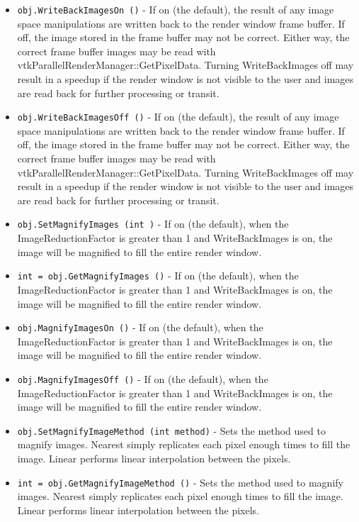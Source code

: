 \begin{itemize}
\item  \verb|obj.WriteBackImagesOn ()| -  If on (the default), the result of any image space manipulations are
 written back to the render window frame buffer.  If off, the image
 stored in the frame buffer may not be correct.  Either way, the
 correct frame buffer images may be read with
 vtkParallelRenderManager::GetPixelData.  Turning WriteBackImages off
 may result in a speedup if the render window is not visible to the user
 and images are read back for further processing or transit.

\item  \verb|obj.WriteBackImagesOff ()| -  If on (the default), the result of any image space manipulations are
 written back to the render window frame buffer.  If off, the image
 stored in the frame buffer may not be correct.  Either way, the
 correct frame buffer images may be read with
 vtkParallelRenderManager::GetPixelData.  Turning WriteBackImages off
 may result in a speedup if the render window is not visible to the user
 and images are read back for further processing or transit.

\item  \verb|obj.SetMagnifyImages (int )| -  If on (the default), when the ImageReductionFactor is greater than 1
 and WriteBackImages is on, the image will be magnified to fill the
 entire render window.

\item  \verb|int = obj.GetMagnifyImages ()| -  If on (the default), when the ImageReductionFactor is greater than 1
 and WriteBackImages is on, the image will be magnified to fill the
 entire render window.

\item  \verb|obj.MagnifyImagesOn ()| -  If on (the default), when the ImageReductionFactor is greater than 1
 and WriteBackImages is on, the image will be magnified to fill the
 entire render window.

\item  \verb|obj.MagnifyImagesOff ()| -  If on (the default), when the ImageReductionFactor is greater than 1
 and WriteBackImages is on, the image will be magnified to fill the
 entire render window.

\item  \verb|obj.SetMagnifyImageMethod (int method)| -  Sets the method used to magnify images.  Nearest simply replicates
 each pixel enough times to fill the image.  Linear performs linear
 interpolation between the pixels.

\item  \verb|int = obj.GetMagnifyImageMethod ()| -  Sets the method used to magnify images.  Nearest simply replicates
 each pixel enough times to fill the image.  Linear performs linear
 interpolation between the pixels.


\end{itemize}
